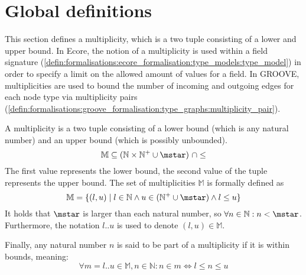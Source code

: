 \section{Global definitions}
\label{sec:formalisations:global_definitions}

This section defines a multiplicity, which is a two tuple consisting of a lower and upper bound. In Ecore, the notion of a multiplicity is used within a field signature (\cref{defin:formalisations:ecore_formalisation:type_models:type_model}) in order to specify a limit on the allowed amount of values for a field. In GROOVE, multiplicities are used to bound the number of incoming and outgoing edges for each node type via multiplicity pairs (\cref{defin:formalisations:groove_formalisation:type_graphs:multiplicity_pair}).

\begin{defin}[Multiplicity]
\label{defin:formalisations:global_definitions:multiplicity}
A multiplicity is a two tuple consisting of a lower bound (which is any natural number) and an upper bound (which is possibly unbounded).
\begin{equation*}
\mathbb{M} \subseteq (\mathbb{N} \times \mathbb{N^+} \cup {\mstar})\ \cap \leq
\end{equation*}
The first value represents the lower bound, the second value of the tuple represents the upper bound. The set of multiplicities $\mathbb{M}$ is formally defined as
\begin{equation*}
\mathbb{M} = \{ (l, u) \mid l \in \mathbb{N} \land u \in (\mathbb{N^+} \cup {\mstar}) \land l \leq u \}
\end{equation*}
It holds that $\mstar$ is larger than each natural number, so $\forall n \in \mathbb{N}: n < \mstar$. Furthermore, the notation $l..u$ is used to denote $(l, u) \in \mathbb{M}$.

Finally, any natural number $n$ is said to be part of a multiplicity if it is within bounds, meaning:
\begin{equation*}
\forall m = l..u \in \mathbb{M}, n \in \mathbb{N} : n \in m \Leftrightarrow l \leq n \leq u
\end{equation*}
\end{defin}